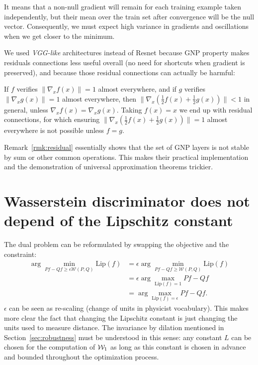 It means that a non-null gradient will remain for each training example taken independently, but their mean over the train set after convergence will be the null vector. Consequently, we must expect high variance in gradients and oscillations when we get closer to the minimum.   
  
We used \textit{VGG-like} architectures instead of Resnet because GNP property makes residuals connections less useful overall (no need for shortcuts when gradient is preserved), and because those residual connections can actually be harmful: 
  
\begin{remark}\label{rmk:residual}
If $f$ verifies $\|\nabla_x f(x)\|=1$ almost everywhere, and if $g$ verifies $\|\nabla_x g(x)\|=1$ almost everywhere, then $\|\nabla_x(\frac{1}{2}f(x)+\frac{1}{2}g(x))\|<1$ in general, unless $\nabla_x f(x)=\nabla_x g(x)$. Taking $f(x)=x$ we end up with residual connections, for which ensuring $\|\nabla_x(\frac{1}{2}f(x)+\frac{1}{2}g(x))\|=1$ almost everywhere is not possible unless $f=g$.  
\end{remark}

Remark~\ref{rmk:residual} essentially shows that the set of GNP layers is not stable by sum or other common operations. This makes their practical implementation and the demonstration of universal approximation theorems trickier.  
  
\section{Wasserstein discriminator does not depend of the Lipschitz constant}\label{sec:krunit}
The dual problem can be reformulated by swapping the objective and the constraint:  
\begin{equation}
    \begin{aligned}
        \arg\min_{Pf-Qf\geq\epsilon\mathcal{W}(P,Q)}\text{Lip}(f)&=\epsilon\arg\min_{Pf-Qf\geq\mathcal{W}(P,Q)}\text{Lip}(f)\\
        &=\epsilon\arg\max_{\text{Lip}(f)=1}{Pf-Qf}\\
        &=\arg\max_{\text{Lip}(f)=\epsilon}{Pf-Qf}.
\end{aligned}
\end{equation}
$\epsilon$ can be seen as re-scaling (change of units in physicist vocabulary). This makes more clear the fact that changing the Lipschitz constant is just changing the units used to measure distance. The invariance by dilation mentioned in Section~\ref{sec:robustness} must be understood in this sense: any constant $L$ can be chosen for the computation of $\mathcal{W}_1$ as long as this constant is chosen in advance and bounded throughout the optimization process.

